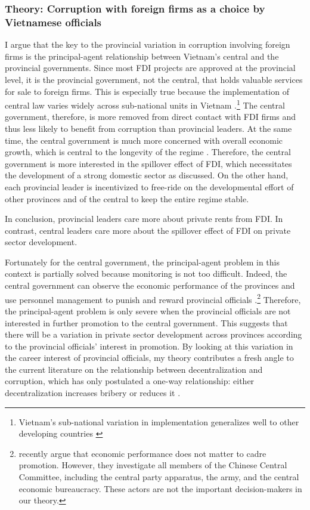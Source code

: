 \subsubsection{Theory: Corruption with foreign firms as a choice by Vietnamese officials} 

I argue that the key to the provincial variation in corruption involving foreign firms is the principal-agent relationship between Vietnam's central and the provincial governments. Since most FDI projects are approved at the provincial level, it is the provincial government, not the central, that holds valuable services for sale to foreign firms. This is especially true because the implementation of central law varies widely across sub-national units in Vietnam \citep{Meyer2005}.\footnote{Vietnam's sub-national variation in implementation generalizes well to other developing countries \citep{Thun2006}} The central government, therefore, is more removed from direct contact with FDI firms and thus less likely to benefit from corruption than provincial leaders. At the same time, the central government is much more concerned with overall economic growth, which is central to the longevity of the regime \citep{Malesky2008}. Therefore, the central government is more interested in the spillover effect of FDI, which necessitates the development of a strong domestic sector as discussed.  On the other hand, each provincial leader is incentivized to free-ride on the developmental effort of other provinces and of the central to keep the entire regime stable. 

In conclusion, provincial leaders care more about private rents from FDI. In contrast, central leaders care more about the spillover effect of FDI on private sector development.

Fortunately for the central government, the principal-agent problem in this context is partially solved because monitoring is not too difficult. Indeed, the central government can observe the economic performance of the provinces and use personnel management to punish and reward provincial officials \citep{Sheng2007, Li2005}.\footnote{\citet{Shih2012} recently argue that economic performance does not matter to cadre promotion. However, they investigate all members of the Chinese Central Committee, including the central party apparatus, the army, and the central economic bureaucracy. These actors are not the important decision-makers in our theory.} Therefore, the principal-agent problem is only severe when the provincial officials are not interested in further promotion to the central government. This suggests that there will be a variation in private sector development across provinces according to the provincial officials' interest in promotion. By looking at this variation in the career interest of provincial officials, my theory contributes a fresh angle to the current literature on the relationship between decentralization and corruption, which has only postulated a one-way relationship: either decentralization increases bribery \citep{Fan2009} or reduces it \citep{Guerra2009}.

